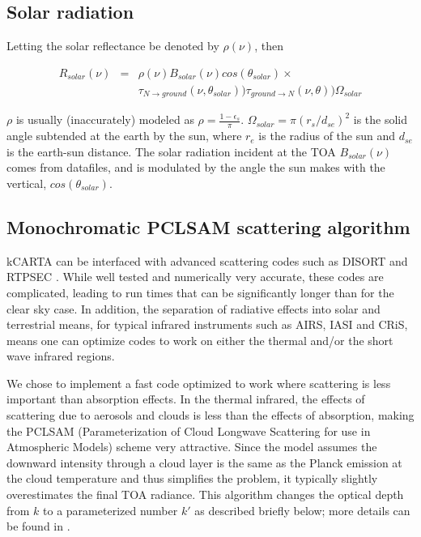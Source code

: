 \documentclass[11pt]{article}
\newcommand{\kc}{\textsf{kCARTA}\xspace}
\begin{document}
\subsection{Solar radiation}

Letting the solar reflectance be denoted by $\rho(\nu)$, then

\begin{eqnarray*}
R_{solar}(\nu) & = & \rho(\nu) B_{solar}(\nu) cos(\theta_{solar}) \times \\
& &                 \tau_{N \rightarrow ground}(\nu,\theta_{solar}))
                 \tau_{ground \rightarrow N}(\nu,\theta))
                 \Omega_{solar}
\end{eqnarray*}

$\rho$ is usually (inaccurately) modeled as
$\rho = \frac{1 - \epsilon_{s}}{\pi}$.
$\Omega_{solar} = \pi(r_{s}/d_{se})^{2}$ is the solid angle subtended at the
earth by the sun, where $r_{e}$ is the radius of the sun and $d_{se}$ is the
earth-sun distance. The solar radiation incident at the TOA $B_{solar}(\nu)$
comes from datafiles, and is modulated by the angle the sun makes with the
vertical, $cos(\theta_{solar})$.

\subsection{\textsf{Monochromatic PCLSAM} scattering algorithm}
\kc can be interfaced with advanced scattering codes such as DISORT \cite{stam:88}
and RTPSEC \cite{dee:98}. While well tested and numerically very accurate, these codes are
complicated, leading to run times that can be significantly longer than for the clear sky case.
In addition, the separation of radiative effects into solar and terrestrial means, 
for typical infrared instruments such as AIRS, IASI and CRiS, means one can optimize 
codes to work on either the thermal and/or the short wave infrared regions. 

We chose to implement a fast code optimized to work where scattering is
less important than absorption effects. In the thermal infrared, the effects of
scattering due to aerosols and clouds is less than the effects of absorption, making
the \textsf{PCLSAM} (Parameterization of Cloud Longwave Scattering for use in
Atmospheric Models) scheme \cite{cho:99} very attractive. Since the model assumes 
the downward intensity through a cloud layer is the same as the Planck emission at the
cloud temperature and thus simplifies the problem, it typically slightly
overestimates the final TOA radiance. This algorithm changes the optical
depth from $k$ to a parameterized number $k\prime$ as described briefly
below; more details can be found in \cite{cho:99,mat:05}.
\end{document}
